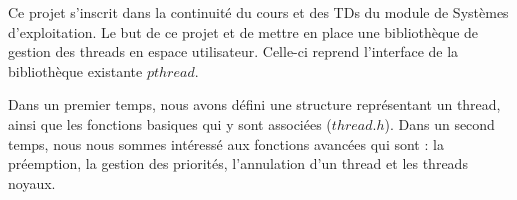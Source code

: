 Ce projet s'inscrit dans la continuité du cours et des TDs du module de
Systèmes d'exploitation. Le but de ce projet et de mettre en place une
bibliothèque de gestion des threads en espace utilisateur. Celle-ci reprend l'interface de la bibliothèque existante $pthread$.

Dans un premier temps, nous avons défini une structure représentant un
thread, ainsi que les fonctions basiques qui y sont associées ($thread.h$).
Dans un second temps, nous nous sommes intéressé aux fonctions avancées qui sont : la préemption, la gestion des priorités, l'annulation d'un thread et les threads noyaux. 
